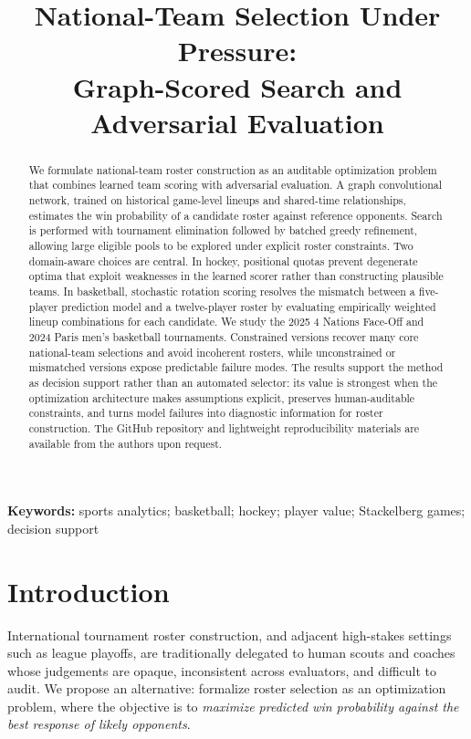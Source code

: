 \documentclass[11pt,letterpaper]{article}
\title{National-Team Selection Under Pressure:\\
Graph-Scored Search and Adversarial Evaluation}
\author{}
\date{}
\begin{document}
\doublespacing
\maketitle

\begin{abstract}
We formulate national-team roster construction as an auditable
optimization problem that combines learned team scoring with adversarial
evaluation. A graph convolutional network, trained on historical
game-level lineups and shared-time relationships, estimates the win
probability of a candidate roster against reference opponents. Search is
performed with tournament elimination followed by batched greedy
refinement, allowing large eligible pools to be explored under explicit
roster constraints. Two domain-aware choices are central. In hockey,
positional quotas prevent degenerate optima that exploit weaknesses in
the learned scorer rather than constructing plausible teams. In
basketball, stochastic rotation scoring resolves the mismatch between a
five-player prediction model and a twelve-player roster by evaluating
empirically weighted lineup combinations for each candidate. We study
the 2025 4 Nations Face-Off and 2024 Paris men's basketball
tournaments. Constrained versions recover many core national-team
selections and avoid incoherent rosters, while unconstrained or
mismatched versions expose predictable failure modes. The results
support the method as decision support rather than an automated
selector: its value is strongest when the optimization architecture
makes assumptions explicit, preserves human-auditable constraints, and
turns model failures into diagnostic information for roster
construction. The GitHub repository and lightweight reproducibility
materials are available from the authors upon request.
\end{abstract}

\noindent\textbf{Keywords:} sports analytics; basketball; hockey;
player value; Stackelberg games; decision support

\section{Introduction}

International tournament roster construction, and adjacent high-stakes
settings such as league playoffs, are traditionally delegated to human
scouts and coaches whose judgements are opaque, inconsistent across
evaluators, and difficult to audit. We propose an alternative:
formalize roster selection as an optimization problem, where the
objective is to
\emph{maximize predicted win probability against the best response of
likely opponents}.
\end{document}
